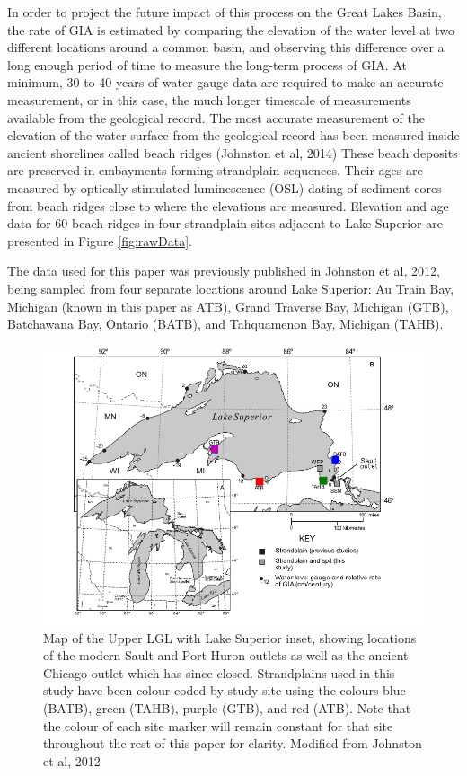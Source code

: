 \documentclass{article}
\begin{document}
\newpage

 
 In order to project the future impact of this process on the Great Lakes Basin,
 the rate of GIA is estimated by comparing the elevation of the water level at
 two different locations around a common basin, and
 observing this difference over a long enough period of time to measure the long-term
 process of GIA. At minimum, 30 to 40 years of water gauge data are required to
 make an accurate measurement, or in this case, the much longer timescale of
 measurements available from the geological record.
 The most accurate measurement of the elevation of the water surface from the geological record
 has been measured inside ancient
 shorelines called beach ridges (Johnston et al, 2014)
 These beach deposits are preserved in embayments forming strandplain sequences.
 Their ages are measured by optically stimulated
 luminescence (OSL) dating of sediment cores from beach ridges close to where the
 elevations are measured. Elevation and age data for 60 beach ridges in
 four strandplain sites adjacent to Lake Superior are presented in Figure \ref{fig:rawData}.\\


\newpage 
 
 The data used for this paper was previously published in
 Johnston et al, 2012, being sampled from four separate locations around
  Lake Superior:
 Au Train Bay, Michigan (known in this paper as ATB), Grand Traverse Bay,
 Michigan (GTB), Batchawana Bay, Ontario (BATB), and 
 Tahquamenon Bay, Michigan (TAHB).\\
 \begin{figure}[h]
	\includegraphics[width=0.8\linewidth]{johnstonLaurentianMapWithSites.png}
	\caption{Map of the Upper LGL with Lake Superior inset, showing locations of the modern Sault and Port Huron
	outlets as well as the ancient Chicago outlet which has since closed. Strandplains used
	in this study have been colour coded by study site using the colours blue (BATB), green (TAHB), purple (GTB), and red (ATB). Note that
	 the colour of each site marker will remain constant for that site throughout the rest of
	 this paper for clarity. Modified from Johnston et al, 2012}
	\label{fig:johnstonLaurentianMapWithSites}
 \end{figure}
\end{document}
